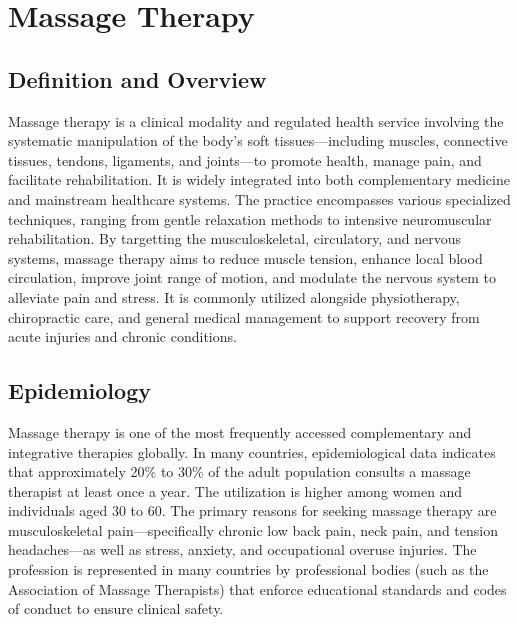 \chapter{Massage Therapy}

\section*{Definition and Overview}
Massage therapy is a clinical modality and regulated health service involving the systematic manipulation of the body's soft tissues—including muscles, connective tissues, tendons, ligaments, and joints—to promote health, manage pain, and facilitate rehabilitation. It is widely integrated into both complementary medicine and mainstream healthcare systems. The practice encompasses various specialized techniques, ranging from gentle relaxation methods to intensive neuromuscular rehabilitation. By targetting the musculoskeletal, circulatory, and nervous systems, massage therapy aims to reduce muscle tension, enhance local blood circulation, improve joint range of motion, and modulate the nervous system to alleviate pain and stress. It is commonly utilized alongside physiotherapy, chiropractic care, and general medical management to support recovery from acute injuries and chronic conditions.

\section*{Epidemiology}
Massage therapy is one of the most frequently accessed complementary and integrative therapies globally. In many countries, epidemiological data indicates that approximately 20\% to 30\% of the adult population consults a massage therapist at least once a year. The utilization is higher among women and individuals aged 30 to 60. The primary reasons for seeking massage therapy are musculoskeletal pain—specifically chronic low back pain, neck pain, and tension headaches—as well as stress, anxiety, and occupational overuse injuries. The profession is represented in many countries by professional bodies (such as the Association of Massage Therapists) that enforce educational standards and codes of conduct to ensure clinical safety.

